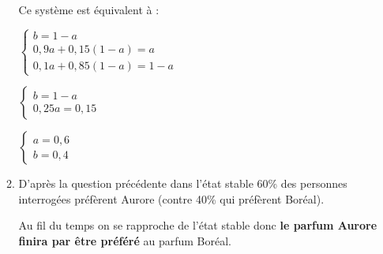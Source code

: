 \begin{corrige}
\begin{enumerate}
\begin{enumerate}[label=\alph*.]
                    \par
                    Ce système est équivalent à :
                    \par
                    $\left\{ \begin{matrix} b=1-a \\ 0,9a+0,15\left(1-a\right)=a \\ 0,1a+0,85\left(1-a\right) =1-a\end{matrix}\right.$
                         \par
                         $\left\{ \begin{matrix} b=1-a \\ 0,25a=0,15 \end{matrix}\right.$
                              \par
                              $\left\{ \begin{matrix} a=0,6 \\ b=0,4 \end{matrix}\right.$
                                   \item
                                   D'après la question précédente dans l'état stable 60\% des personnes interrogées préfèrent Aurore (contre 40\% qui préfèrent Boréal).
                                   \par
                                   Au fil du temps on se rapproche de l'état stable donc \textbf{le parfum Aurore finira par être préféré} au parfum Boréal.
                              \end{enumerate}
                         \end{enumerate}
                    \end{corrige}
